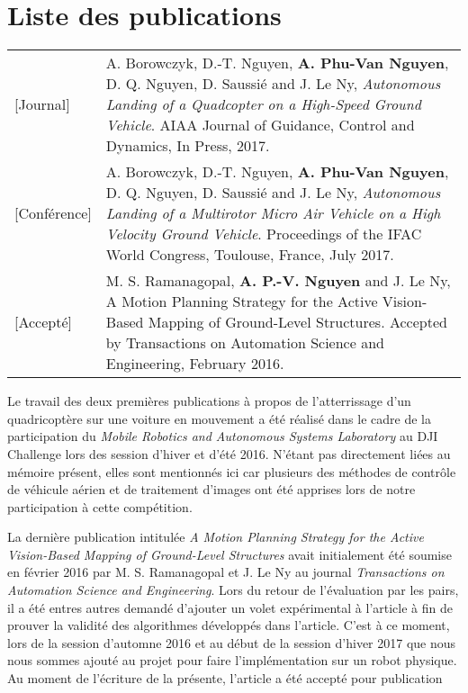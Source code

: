\chapter*{Liste des publications}

\begin{longtable}{lp{5in}}
  [Journal]     & A. Borowczyk, D.-T. Nguyen, \textbf{A. Phu-Van Nguyen}, D. Q. Nguyen, D. Saussié and J. Le Ny, \textit{Autonomous Landing of a Quadcopter on a High-Speed Ground Vehicle}. AIAA Journal of Guidance, Control and Dynamics, In Press, 2017.\\

  [Conférence]  & A. Borowczyk, D.-T. Nguyen, \textbf{A. Phu-Van Nguyen}, D. Q. Nguyen, D. Saussié and J. Le Ny, \textit{Autonomous Landing of a Multirotor Micro Air Vehicle on a High Velocity Ground Vehicle}. Proceedings of the IFAC World Congress, Toulouse, France, July 2017.\\

  [Accepté]      & M. S. Ramanagopal, \textbf{A. P.-V. Nguyen} and J. Le Ny, A Motion Planning Strategy for the Active Vision-Based Mapping of Ground-Level Structures. Accepted by Transactions on Automation Science and Engineering, February 2016.
\end{longtable}

Le travail des deux premières publications à propos de l'atterrissage d'un quadricoptère sur une voiture en mouvement a été réalisé dans le cadre de la participation du \textit{Mobile Robotics and Autonomous Systems Laboratory} au DJI Challenge lors des session d'hiver et d'été 2016. N'étant pas directement liées au mémoire présent, elles sont mentionnés ici car plusieurs des méthodes de contrôle de véhicule aérien et de traitement d'images ont été apprises lors de notre participation à cette compétition.

La dernière publication intitulée \textit{A Motion Planning Strategy for the Active Vision-Based Mapping of Ground-Level Structures} avait initialement été soumise en février 2016 par M. S. Ramanagopal et J. Le Ny au journal \textit{Transactions on Automation Science and Engineering}. Lors du retour de l'évaluation par les pairs, il a été entres autres demandé d'ajouter un volet expérimental à l'article à fin de prouver la validité des algorithmes développés dans l'article. C'est à ce moment, lors de la session d'automne 2016 et au début de la session d'hiver 2017 que nous nous sommes ajouté au projet pour faire l'implémentation sur un robot physique. Au moment de l'écriture de la présente, l'article a été accepté pour publication
